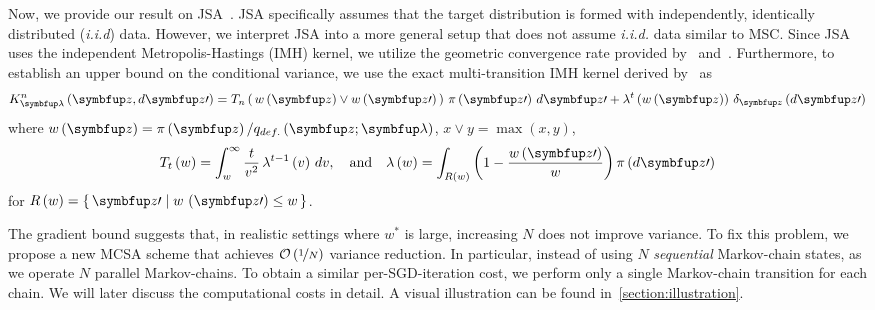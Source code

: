 Now, we provide our result on JSA~\citep{pmlr-v124-ou20a}.
JSA specifically assumes that the target distribution is formed with independently, identically distributed (\textit{i.i.d}) data.
However, we interpret JSA into a more general setup that does not assume \textit{i.i.d.} data similar to MSC.
Since JSA~\citep{pmlr-v124-ou20a} uses the independent Metropolis-Hastings (IMH) kernel, we utilize the geometric convergence rate provided by~\citet[Theorem 2.1]{10.2307/2242610} and~\citet{wang_exact_2020}.
Furthermore, to establish an upper bound on the conditional variance, we use the exact multi-transition IMH kernel derived by~\cite{Smith96exacttransition} as
{%
  \begin{align}
  K^n_{\vlambda}\left(\vz, d\vz\prime\right) 
  = T_n\left(\, w\left(\vz\right) \vee w\left(\vz\prime\right)\,\right) \, \pi\left(\vz\prime\right) \, d\vz\prime
  + \lambda^t\left(w\left(\vz\right)\right) \, \delta_{\vz}\left(d\vz\prime\right)
  \label{eq:imh_exact_kernel}
  \end{align}
}%
where {\(w\left(\vz\right) = \pi\left(\vz\right)/q_{def.}\left(\vz; \vlambda\right)\), \(x \vee y = \max\left(x, y\right)\)},
{%
  \begin{align}
    T_t\left(w\right)      = \int_w^{\infty} \frac{t}{v^2} \, \lambda^{t-1}\left(v\right)\,dv,
    \quad\text{and}\quad
    \lambda\left(w\right) = \int_{R\left(w\right)} \left( 1 - \frac{w\left(\vz\prime\right)}{w}  \right) \pi\left(d\vz\prime\right)\label{eq:T_lambda}
  \end{align}
}
for {\(R\left(w\right) = \{\, \vz\prime \mid w\,\left(\vz\prime\right) \leq w \,\}\)}.
%


%
The gradient bound suggests that, in realistic settings where \(w^*\) is large, increasing \(N\) does not improve variance.
To fix this problem, we propose a new MCSA scheme that achieves \(\mathcal{O}\left(\nicefrac{1}{N}\right)\) variance reduction.
In particular, instead of using \(N\) \textit{sequential} Markov-chain states, as we operate \(N\) parallel Markov-chains.
To obtain a similar per-SGD-iteration cost, we perform only a single Markov-chain transition for each chain.
We will later discuss the computational costs in detail.
A visual illustration can be found in~\cref{section:illustration}.



